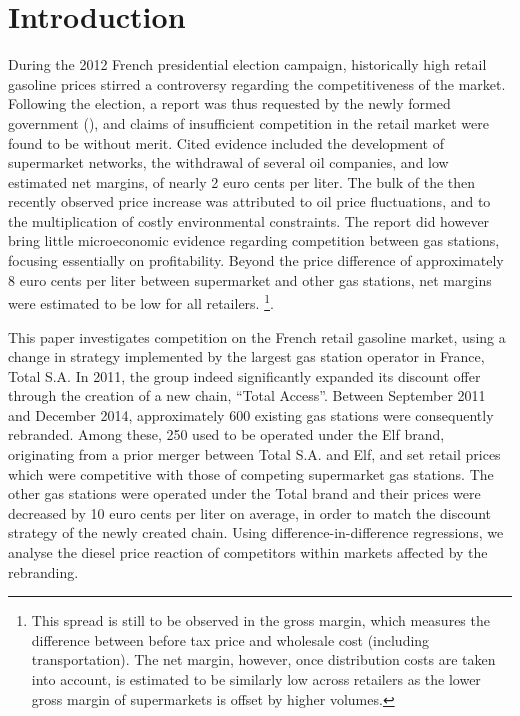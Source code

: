 \documentclass[english]{article}
\begin{document}
\section{Introduction}

During the 2012 French presidential election campaign, historically high retail gasoline prices stirred a controversy regarding the competitiveness of the market. Following the election, a report was thus requested by the newly formed government (\cite{BEL12}), and claims of insufficient competition in the retail market were found to be without merit. Cited evidence included the development of supermarket networks, the withdrawal of several oil companies, and low estimated net margins, of nearly 2 euro cents per liter. The bulk of the then recently observed price increase was attributed to oil price fluctuations, and to the multiplication of costly environmental constraints. The report did however bring little microeconomic evidence regarding competition between gas stations, focusing essentially on profitability. Beyond the price difference of approximately 8 euro cents per liter between supermarket and other gas stations, net margins were estimated to be low for all retailers.%
\footnote{This spread is still to be observed in the gross margin, which measures the difference between before tax price and wholesale cost (including transportation). The net margin, however, once distribution costs are taken into account, is estimated to be similarly low across retailers as the lower gross margin of supermarkets is offset by higher volumes.}.

This paper investigates competition on the French retail gasoline market, using a change in strategy implemented by the largest gas station operator in France, Total S.A. In 2011, the group indeed significantly expanded its discount offer through the creation of a new chain, ``Total Access''. Between September 2011 and December 2014, approximately 600 existing gas stations were consequently rebranded. Among these, 250 used to be operated under the Elf brand, originating from a prior merger between Total S.A. and Elf, and set retail prices which were competitive with those of competing supermarket gas stations. The other gas stations were operated under the Total brand and their prices were decreased by 10 euro cents per liter on average, in order to match the discount strategy of the newly created chain. Using difference-in-difference regressions, we analyse the diesel price reaction of competitors within markets affected by the rebranding.
\end{document}
